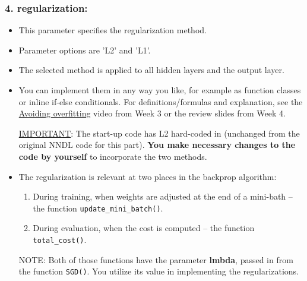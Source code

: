 \documentclass[11pt]{article}
\begin{document}
\subsubsection*{4. regularization:}
\label{sec:org0a83846}
\begin{itemize}
\item This parameter specifies the regularization method.
\item Parameter options are 'L2' and 'L1'.
\item The selected method is applied to all hidden layers and the output layer.

\item You can implement them in any way you like, for example as function classes or inline if-else conditionals.  For definitions/formulas and explanation, see the \href{https://depaul.zoom.us/rec/share/HUia84Y0b\_OkQT2c9n39dGkUlyvNU0LqtmnnCz7gQ0vJ50hF\_up4sU0YWa4ABBQ.SS5hVQmvqRtOWFPa}{Avoiding overfitting} video from Week 3 or the review slides from Week 4.

\uline{IMPORTANT}: The start-up code has L2 hard-coded in (unchanged from the original NNDL code for this part).  \textbf{You make necessary changes to the code by yourself} to incorporate the two methods.
\item The regularization is relevant at two places in the backprop algorithm:
\begin{enumerate}
\item During training, when weights are adjusted at the end of a mini-bath -- the function \texttt{update\_mini\_batch()}.
\item During evaluation, when the cost is computed -- the function \texttt{total\_cost()}.
\end{enumerate}

NOTE: Both of those functions have the parameter \textbf{lmbda}, passed in from the function \texttt{SGD()}.  You utilize its value in implementing the regularizations.
\end{itemize}
\end{document}
